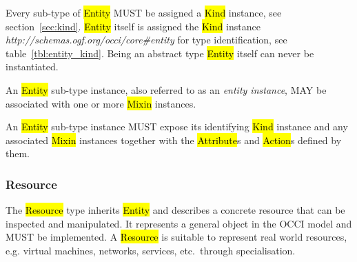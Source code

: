 \documentclass[10pt,a4paper]{article}
\begin{document}
Every sub-type of \hl{Entity} MUST be assigned a \hl{Kind} instance,
see section~\ref{sec:kind}.
%
%
\hl{Entity} itself is assigned the \hl{Kind} instance
\textit{http://schemas.ogf.org/occi/core\#entity} for type
identification, see table~\ref{tbl:entity_kind}.
%
Being an abstract type \hl{Entity} itself can never be instantiated.

An \hl{Entity} sub-type instance, also referred to as an {\em entity instance},
MAY be associated with one or more \hl{Mixin} instances.

An \hl{Entity} sub-type instance MUST expose its identifying \hl{Kind}
instance and any associated \hl{Mixin} instances together with the
\hl{Attribute}s and \hl{Action}s defined by them.

\subsubsection{Resource}
\label{sec:resource}
The \hl{Resource} type inherits \hl{Entity} and describes a concrete
resource that can be inspected and manipulated. It represents a
general object in the OCCI model and MUST be implemented. A
\hl{Resource} is suitable to represent real world resources,
e.g. virtual machines, networks, services, etc.~through
specialisation.

\end{document}
